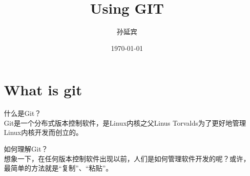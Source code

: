 ﻿\documentclass{beamer}
\title{\ttfamily Using GIT}
\author{孙延宾}
\institute{西安$\cdot$业务软件开发一部$\cdot$~\texttt{ZTE}}
\date{\today}
\begin{document}
\begin{frame}[plain]
  \titlepage
\end{frame}

\part[What is git]{What is git}
\begin{frame}
\begin{framedtext}
  什么是Git？\\[1em]
  Git是一个分布式版本控制软件，是Linux内核之父Linus Torvalds为了更好地管理Linux内核开发而创立的。
\end{framedtext}
\end{frame}

\begin{frame}
\begin{framedtext}
  如何理解Git？\\[1em]
  想象一下，在任何版本控制软件出现以前，人们是如何管理软件开发的呢？或许，最简单的方法就是“复制”、“粘贴”。
\end{framedtext}
\end{frame}
\end{document}
